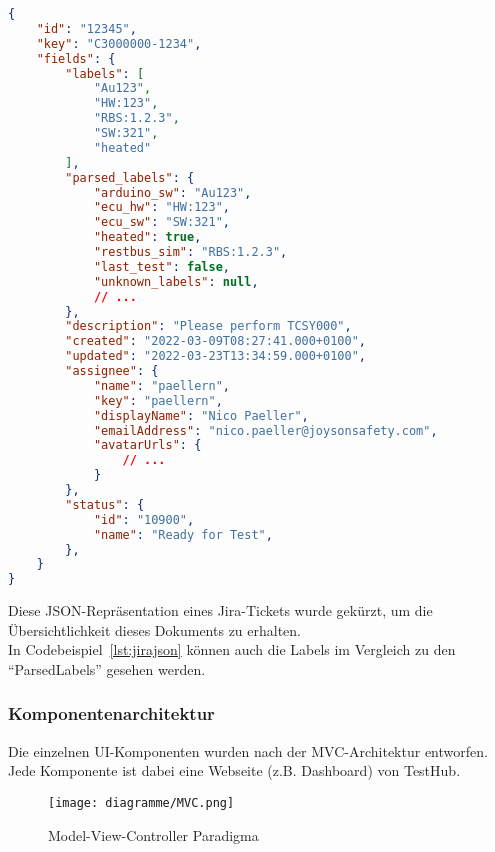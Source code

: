\begin{lstlisting}[caption=gekürzte beispielhafte JSON Repräsentation eines Jira-Tickets,language=json,label={lst:jirajson}]
{
    "id": "12345",
    "key": "C3000000-1234",
    "fields": {
        "labels": [
            "Au123",
            "HW:123",
            "RBS:1.2.3",
            "SW:321",
            "heated"
        ],
        "parsed_labels": {
            "arduino_sw": "Au123",
            "ecu_hw": "HW:123",
            "ecu_sw": "SW:321",
            "heated": true,
            "restbus_sim": "RBS:1.2.3",
            "last_test": false,
            "unknown_labels": null,
            // ...
        },
        "description": "Please perform TCSY000",
        "created": "2022-03-09T08:27:41.000+0100",
        "updated": "2022-03-23T13:34:59.000+0100",
        "assignee": {
            "name": "paellern",
            "key": "paellern",
            "displayName": "Nico Paeller",
            "emailAddress": "nico.paeller@joysonsafety.com",
            "avatarUrls": {
                // ...
            }
        },
        "status": {
            "id": "10900",
            "name": "Ready for Test",
        },
    }
}
\end{lstlisting}

Diese \gls{JSON}-Repräsentation eines Jira-Tickets wurde gekürzt, um die Übersichtlichkeit
dieses Dokuments zu erhalten. \\

In Codebeispiel~\ref{lst:jirajson} können auch die Labels im Vergleich zu den
``ParsedLabels'' gesehen werden.

\subsubsection{Komponentenarchitektur}
Die einzelnen \gls{UI}-Komponenten wurden nach der \gls{MVC}-Architektur entworfen. 
Jede Komponente ist dabei eine Webseite (z.B. Dashboard) von TestHub.

\begin{figure}[H]
    \texttt{[image: diagramme/MVC.png]}
    \caption{Model-View-Controller Paradigma}\label{fig:mvc}
\end{figure}

